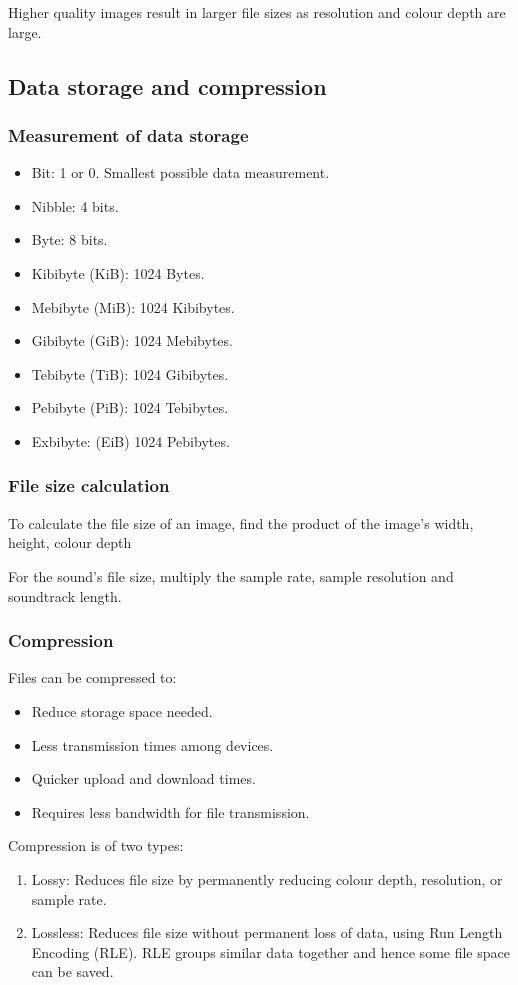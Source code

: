 \documentclass{article}
\begin{document}
Higher quality images result in larger file sizes as resolution and colour depth are 
large.

\subsection{Data storage and compression}
\subsubsection{Measurement of data storage}
\begin{itemize}
	\item Bit: 1 or 0. Smallest possible data measurement.
	\item Nibble: 4 bits.
	\item Byte: 8 bits.
	\item Kibibyte (KiB): 1024 Bytes.
	\item Mebibyte (MiB): 1024 Kibibytes.
	\item Gibibyte (GiB): 1024 Mebibytes.
	\item Tebibyte (TiB): 1024 Gibibytes.
	\item Pebibyte (PiB): 1024 Tebibytes.
	\item Exbibyte: (EiB) 1024 Pebibytes.
\end{itemize}

\subsubsection{File size calculation}
To calculate the file size of an image, find the product of the image's width, height, 
colour depth

For the sound's file size, multiply the sample rate, sample resolution and soundtrack
length.

\subsubsection{Compression}
Files can be compressed to:
\begin{itemize}
	\item Reduce storage space needed.
	\item Less transmission times among devices.
	\item Quicker upload and download times.
	\item Requires less bandwidth for file transmission.
\end{itemize}
Compression is of two types:
\begin{enumerate}
	\item Lossy: Reduces file size by permanently reducing colour depth, resolution, or 
		sample rate.
	\item Lossless: Reduces file size without permanent loss of data, using Run Length
		Encoding (RLE). RLE groups similar data together and hence some file space can
		be saved.
\end{enumerate}
\end{document}
